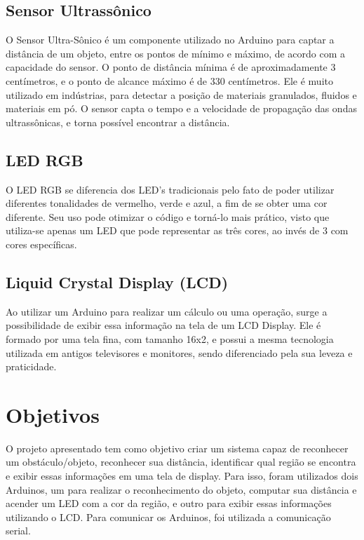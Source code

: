 \documentclass[conference]{IEEEtran}
\begin{document}
\subsection{Sensor Ultrassônico}

    O Sensor Ultra-Sônico é um componente utilizado no Arduino para captar a distância de um objeto, 
entre os pontos de mínimo e máximo, de acordo com a capacidade do sensor. O ponto de distância mínima 
é de aproximadamente 3 centímetros, e o ponto de alcance máximo é de 330 centímetros. Ele é muito
utilizado em indústrias, para detectar a posição de materiais granulados, fluidos e materiais em pó.
O sensor capta o tempo e a velocidade de propagação das ondas ultrassônicas, e torna possível encontrar
a distância.

\subsection{LED RGB}

    O LED RGB se diferencia dos LED's tradicionais pelo fato de poder utilizar diferentes tonalidades de
vermelho, verde e azul, a fim de se obter uma cor diferente. Seu uso pode otimizar o código e torná-lo
mais prático, visto que utiliza-se apenas um LED que pode representar as três cores, ao invés de 3 com
cores específicas.

\subsection{Liquid Crystal Display (LCD)}

    Ao utilizar um Arduino para realizar um cálculo ou uma operação, surge a possibilidade de exibir essa
informação na tela de um LCD Display. Ele é formado por uma tela fina, com tamanho 16x2, e possui a mesma
tecnologia utilizada em antigos televisores e monitores, sendo diferenciado pela sua leveza e praticidade.

\section{Objetivos}

    O projeto apresentado tem como objetivo criar um sistema capaz de reconhecer um obstáculo/objeto,
reconhecer sua distância, identificar qual região se encontra e exibir essas informações em uma tela de 
display. Para isso, foram utilizados dois Arduinos, um para realizar o reconhecimento do objeto, computar
sua distância e acender um LED com a cor da região, e outro para exibir essas informações utilizando o
LCD. Para comunicar os Arduinos, foi utilizada a comunicação serial.
\end{document}
